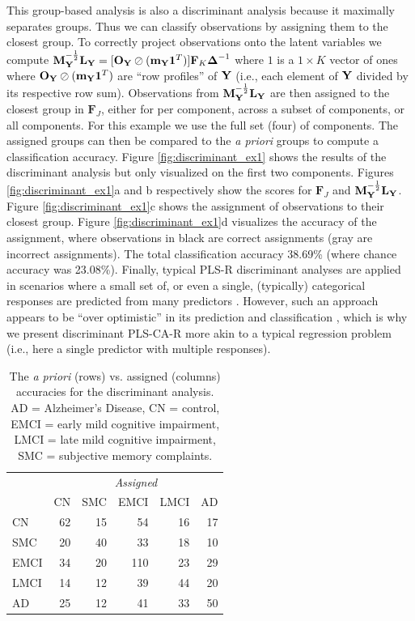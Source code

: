\documentclass[12pt]{article}
\begin{document}
This group-based analysis is also a discriminant analysis because it
maximally separates groups. Thus we can classify observations by
assigning them to the closest group. To correctly project observations
onto the latent variables we compute
\({\bf M}_{\bf Y}^{-\frac{1}{2}}{\mathbf L}_{\mathbf Y} = [{\bf O}_{\bf Y} \oslash ({\bf m}_{\bf Y}{\bf 1}^T)]{\bf F}_{K}\boldsymbol{\Delta}^{-1}\)
where \(1\) is a \(1 \times K\) vector of ones where
\({\bf O}_{\bf Y} \oslash ({\bf m}_{\bf Y}{\bf 1}^T)\) are ``row
profiles'' of \({\bf Y}\) (i.e., each element of \({\bf Y}\) divided by
its respective row sum). Observations from
\({\bf M}_{\bf Y}^{-\frac{1}{2}}{\mathbf L}_{\mathbf Y}\) are then
assigned to the closest group in \({\mathbf F}_{J}\), either for per
component, across a subset of components, or all components. For this
example we use the full set (four) of components. The assigned groups
can then be compared to the \emph{a priori} groups to compute a
classification accuracy. Figure \ref{fig:discriminant_ex1} shows the
results of the discriminant analysis but only visualized on the first
two components. Figures \ref{fig:discriminant_ex1}a and b respectively
show the scores for \({\mathbf F}_{J}\) and
\({\bf M}_{\bf Y}^{-\frac{1}{2}}{\mathbf L}_{\mathbf Y}\). Figure
\ref{fig:discriminant_ex1}c shows the assignment of observations to
their closest group. Figure \ref{fig:discriminant_ex1}d visualizes the
accuracy of the assignment, where observations in black are correct
assignments (gray are incorrect assignments). The total classification
accuracy 38.69\% (where chance accuracy was 23.08\%). Finally, typical
PLS-R discriminant analyses are applied in scenarios where a small set
of, or even a single, (typically) categorical responses are predicted
from many predictors \citep{perez-enciso_prediction_2003}. However, such
an approach appears to be ``over optimistic'' in its prediction and
classification \citep{rodriguez-perez_overoptimism_2018}, which is why
we present discriminant PLS-CA-R more akin to a typical regression
problem (i.e., here a single predictor with multiple responses).

\begin{table}[!h]

\caption{\label{tab:unnamed-chunk-6}\label{table:assign_ex1} The \textit{a priori} (rows) vs. assigned (columns) accuracies for the discriminant analysis. AD = Alzheimer's Disease, CN = control, EMCI = early mild cognitive impairment, LMCI = late mild cognitive impairment, SMC = subjective memory complaints.}
\centering
\begin{tabular}[t]{lrrrrr}
\toprule
\multicolumn{1}{c}{\em{ }} & \multicolumn{5}{c}{\em{Assigned}} \\
\cmidrule(l{3pt}r{3pt}){2-6}
  & CN & SMC & EMCI & LMCI & AD\\
\midrule
CN & 62 & 15 & 54 & 16 & 17\\
SMC & 20 & 40 & 33 & 18 & 10\\
EMCI & 34 & 20 & 110 & 23 & 29\\
LMCI & 14 & 12 & 39 & 44 & 20\\
AD & 25 & 12 & 41 & 33 & 50\\
\bottomrule
\end{tabular}
\end{table}
\end{document}
